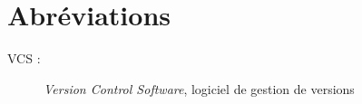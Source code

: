 \chapter*{Abréviations}

\begin{description}
    \item[VCS : ] \emph{Version Control Software}, logiciel de gestion de versions
\end{description}
